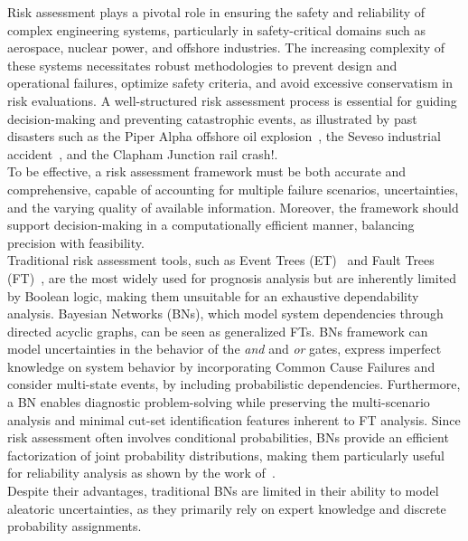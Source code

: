 
Risk assessment plays a pivotal role in ensuring the safety and reliability of complex engineering systems, particularly in safety-critical domains such as aerospace, nuclear power, and offshore industries.
The increasing complexity of these systems necessitates robust methodologies to prevent design and operational failures, optimize safety criteria, and avoid excessive conservatism in risk evaluations.
A well-structured risk assessment process is essential for guiding decision-making and preventing catastrophic events, as illustrated by past disasters such as the Piper Alpha offshore oil explosion~\cite{Piper_alpha}, the Seveso industrial accident~\cite{Seveso}, and the Clapham Junction rail crash!\cite{Clapham}. \\
To be effective, a risk assessment framework must be both accurate and comprehensive, capable of accounting for multiple failure scenarios, uncertainties, and the varying quality of available information. Moreover, the framework should support decision-making in a computationally efficient manner, balancing precision with feasibility. \\
Traditional risk assessment tools, such as Event Trees (ET)~\cite{papazoglou_mathematical_1998} and Fault Trees (FT)~\cite{kabir_overview_2017}, are the most widely used for prognosis analysis but are inherently limited by Boolean logic, making them unsuitable for an exhaustive dependability analysis. Bayesian Networks (BNs), which model system dependencies through directed acyclic graphs, can be seen as generalized FTs. BNs framework can model uncertainties in the behavior of the \textit{and} and \textit{or} gates, express imperfect knowledge on system behavior by incorporating Common Cause Failures and consider multi-state events, by including probabilistic dependencies. Furthermore, a BN enables diagnostic problem-solving while preserving the multi-scenario analysis and minimal cut-set identification features inherent to FT analysis.
Since risk assessment often involves conditional probabilities, BNs provide an efficient factorization of joint probability distributions, making them particularly useful for reliability analysis as shown by the work of~\textcite{langseth_bayesian_2007}. \\
Despite their advantages, traditional BNs are limited in their ability to model aleatoric uncertainties, as they primarily rely on expert knowledge and discrete probability assignments.\\

